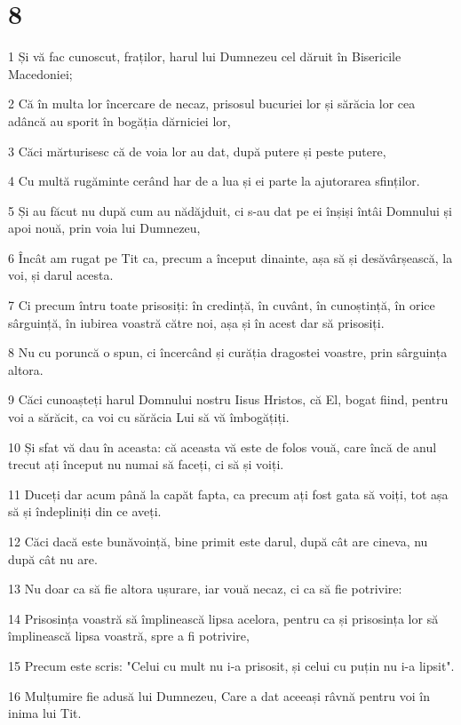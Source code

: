 \chapter{8}

\par 1 Și vă fac cunoscut, fraților, harul lui Dumnezeu cel dăruit în Bisericile Macedoniei;
\par 2 Că în multa lor încercare de necaz, prisosul bucuriei lor și sărăcia lor cea adâncă au sporit în bogăția dărniciei lor,
\par 3 Căci mărturisesc că de voia lor au dat, după putere și peste putere,
\par 4 Cu multă rugăminte cerând har de a lua și ei parte la ajutorarea sfinților.
\par 5 Și au făcut nu după cum au nădăjduit, ci s-au dat pe ei înșiși întâi Domnului și apoi nouă, prin voia lui Dumnezeu,
\par 6 Încât am rugat pe Tit ca, precum a început dinainte, așa să și desăvârșească, la voi, și darul acesta.
\par 7 Ci precum întru toate prisosiți: în credință, în cuvânt, în cunoștință, în orice sârguință, în iubirea voastră către noi, așa și în acest dar să prisosiți.
\par 8 Nu cu poruncă o spun, ci încercând și curăția dragostei voastre, prin sârguința altora.
\par 9 Căci cunoașteți harul Domnului nostru Iisus Hristos, că El, bogat fiind, pentru voi a sărăcit, ca voi cu sărăcia Lui să vă îmbogățiți.
\par 10 Și sfat vă dau în aceasta: că aceasta vă este de folos vouă, care încă de anul trecut ați început nu numai să faceți, ci să și voiți.
\par 11 Duceți dar acum până la capăt fapta, ca precum ați fost gata să voiți, tot așa să și îndepliniți din ce aveți.
\par 12 Căci dacă este bunăvoință, bine primit este darul, după cât are cineva, nu după cât nu are.
\par 13 Nu doar ca să fie altora ușurare, iar vouă necaz, ci ca să fie potrivire:
\par 14 Prisosința voastră să împlinească lipsa acelora, pentru ca și prisosința lor să împlinească lipsa voastră, spre a fi potrivire,
\par 15 Precum este scris: "Celui cu mult nu i-a prisosit, și celui cu puțin nu i-a lipsit".
\par 16 Mulțumire fie adusă lui Dumnezeu, Care a dat aceeași râvnă pentru voi în inima lui Tit.
